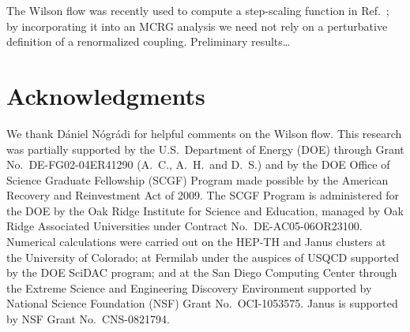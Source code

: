 \documentclass{PoS}
\newcommand{\refcite}[1]{Ref.~\cite{#1}}
\begin{document}
The Wilson flow was recently used to compute a step-scaling function in \refcite{Fodor:2012td}; by incorporating it into an MCRG analysis we need not rely on a perturbative definition of a renormalized coupling.
Preliminary results\dots



\section*{Acknowledgments} %
We thank D\'aniel N\'ogr\'adi for helpful comments on the Wilson flow.
This research was partially supported by the U.S.~Department of Energy (DOE) through Grant No.~DE-FG02-04ER41290 (A.~C., A.~H.\ and D.~S.) and by the DOE Office of Science Graduate Fellowship (SCGF) Program made possible by the American Recovery and Reinvestment Act of 2009.
The SCGF Program is administered for the DOE by the Oak Ridge Institute for Science and Education, managed by Oak Ridge Associated Universities under Contract No.~DE-AC05-06OR23100.
Numerical calculations were carried out on the HEP-TH and Janus clusters at the University of Colorado; at Fermilab under the auspices of USQCD supported by the DOE SciDAC program; and at the San Diego Computing Center through the Extreme Science and Engineering Discovery Environment supported by National Science Foundation (NSF) Grant No.~OCI-1053575.
Janus is supported by NSF Grant No.~CNS-0821794.





\end{document}
